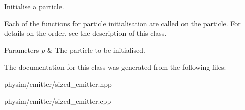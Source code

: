 Initialise a particle. 

Each of the functions for particle initialisation are called on the particle. For details on the order, see the description of this class. 
\begin{DoxyParams}{Parameters}
{\em p} & The particle to be initialised. \\
\hline
\end{DoxyParams}


The documentation for this class was generated from the following files\+:\begin{DoxyCompactItemize}
\item 
physim/emitter/sized\+\_\+emitter.\+hpp\item 
physim/emitter/sized\+\_\+emitter.\+cpp\end{DoxyCompactItemize}
